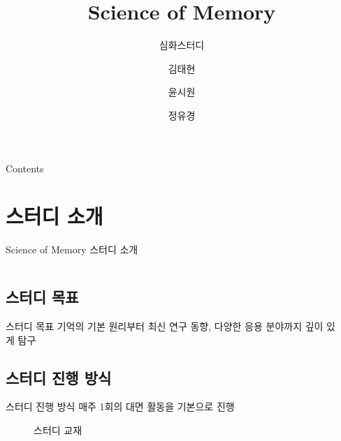 \documentclass{beamer}
\date{\displaydate{date}}
\title{Science of Memory}
\subtitle{심화스터디}
\author{김태현\and 윤시원\and 정유경}
\institute{BCSC 2025}
\date{\displaydate{date}}
\begin{document}
\begin{frame}
    \titlepage
\end{frame}

\begin{frame}{Contents}
  \tableofcontents
\end{frame}

\section{스터디 소개}
\begin{frame}{Science of Memory 스터디 소개}
  \begin{columns}
    \begin{column}{0.39\textwidth}
      \subsection{스터디 목표}
      \begin{block}{스터디 목표}
        기억의 기본 원리부터 최신 연구 동향, 다양한 응용 분야까지 깊이 있게 탐구
      \end{block}
      \subsection{스터디 진행 방식}
      \begin{block}{스터디 진행 방식}
        매주 1회의 대면 활동을 기본으로 진행
      \end{block}
      \vspace{-1em}
      \begin{figure}
        \centering
        \qquad
        \vspace{-0.5em}
        \caption{스터디 교재}
      \end{figure}
    \end{column}
    \hfill
    \begin{column}{0.6\textwidth}

\end{column}
\end{columns}
\end{frame}
\end{document}
